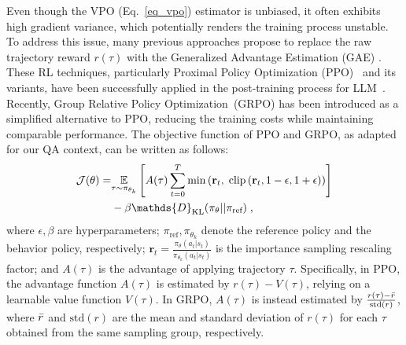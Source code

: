 Even though the VPO (Eq.~\ref{eq_vpo}) estimator is unbiased,
it often exhibits high gradient variance, which potentially renders the training process unstable.
To address this issue, many previous approaches \cite{schulman2015trust, schulman2017proximal} propose to replace the raw trajectory reward $r(\tau)$ with the Generalized Advantage Estimation (GAE) \citep{schulman2016high}.
These RL techniques, particularly Proximal Policy Optimization (PPO)~\cite{schulman2017proximal} and its variants, have been successfully applied in the post-training process for LLM~\citep{ouyang2022training, rafailov2023direct}.
Recently, Group Relative Policy Optimization~(GRPO) \citep{shao2024deepseekmath} has been introduced as a simplified alternative to PPO, reducing the training costs while maintaining comparable performance.
The objective function of PPO and GRPO, as adapted for our QA context, can be written as follows:
\begin{equation}
\label{eq_ppo}
\begin{aligned}
    \mathcal{J}(\theta) = &\underset{\tau \sim \pi_{\theta_k}}{\mathbb{E}}
    \left[ A(\tau) \sum_{t=0}^T
\min \left(\mathbf{r}_t, \;
\text{clip}\left(\mathbf{r}_t, 1-\epsilon, 1+\epsilon \right) \right)\right]
\\& \hspace*{\fill} - \beta \mathds{D}_{\text{KL}}(\pi_\theta || \pi_{\text{ref}})  \; ,
\end{aligned}
\end{equation}
where $\epsilon, \beta$ are hyperparameters; $\pi_{\text{ref}}, \pi_{\theta_k}$ denote the reference policy and the behavior policy, respectively; 
$\mathbf{r}_t = \frac{\pi_\theta(a_t|s_t)}{\pi_{\theta_k}(a_t|s_t)}$ is the importance sampling rescaling factor; and $A(\tau)$ is the advantage of applying trajectory $\tau$.
Specifically, in PPO, the advantage function $A(\tau)$ is estimated by $r(\tau) - V(\tau)$, relying on a learnable value function $V(\tau)$.
In GRPO, $A(\tau)$ is instead estimated by $\frac{r(\tau) - \Bar{r}}{\text{std}(r)}$, where $\Bar{r}$ and $\text{std}(r)$ are the mean and standard deviation of $r(\tau)$ for each $\tau$ obtained from the same sampling group, respectively. 


